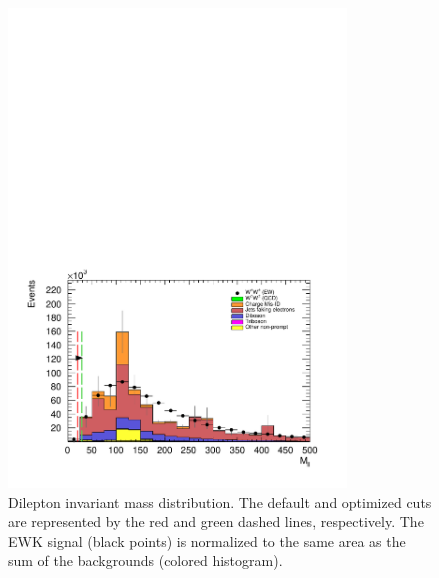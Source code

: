 \begin{figure}[htp]
  \centering
  \includegraphics[width=0.8\textwidth]{figs/ssww_upgrade/optimization_plots/mll}
  \caption{Dilepton invariant mass distribution.  The default and optimized cuts are represented by the red and green dashed lines, respectively.  The \ssww EWK signal (black points) is normalized to the same area as the sum of the backgrounds (colored histogram).}
  \label{fig:optimized_mll}
\end{figure}

